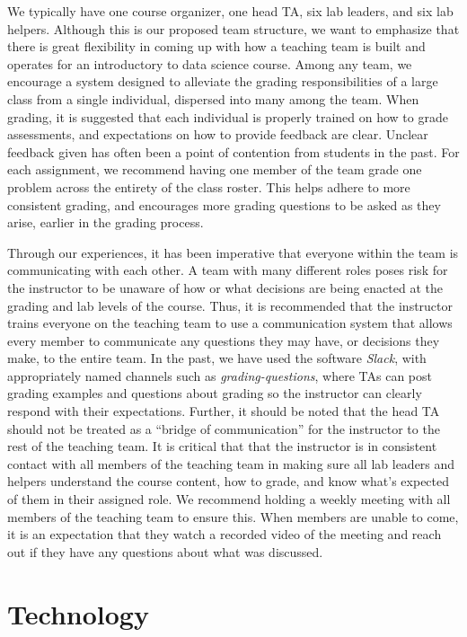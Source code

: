 \documentclass[
  12pt]{article}
\begin{document}
We typically have one course organizer, one head TA, six lab leaders,
and six lab helpers. Although this is our proposed team structure, we
want to emphasize that there is great flexibility in coming up with how
a teaching team is built and operates for an introductory to data
science course. Among any team, we encourage a system designed to
alleviate the grading responsibilities of a large class from a single
individual, dispersed into many among the team. When grading, it is
suggested that each individual is properly trained on how to grade
assessments, and expectations on how to provide feedback are clear.
Unclear feedback given has often been a point of contention from
students in the past. For each assignment, we recommend having one
member of the team grade one problem across the entirety of the class
roster. This helps adhere to more consistent grading, and encourages
more grading questions to be asked as they arise, earlier in the grading
process.

Through our experiences, it has been imperative that everyone within the
team is communicating with each other. A team with many different roles
poses risk for the instructor to be unaware of how or what decisions are
being enacted at the grading and lab levels of the course. Thus, it is
recommended that the instructor trains everyone on the teaching team to
use a communication system that allows every member to communicate any
questions they may have, or decisions they make, to the entire team. In
the past, we have used the software \emph{Slack}, with appropriately
named channels such as \emph{grading-questions}, where TAs can post
grading examples and questions about grading so the instructor can
clearly respond with their expectations. Further, it should be noted
that the head TA should not be treated as a ``bridge of communication''
for the instructor to the rest of the teaching team. It is critical that
that the instructor is in consistent contact with all members of the
teaching team in making sure all lab leaders and helpers understand the
course content, how to grade, and know what's expected of them in their
assigned role. We recommend holding a weekly meeting with all members of
the teaching team to ensure this. When members are unable to come, it is
an expectation that they watch a recorded video of the meeting and reach
out if they have any questions about what was discussed.

\hypertarget{sec-tech}{%
\section{Technology}\label{sec-tech}}
\end{document}
